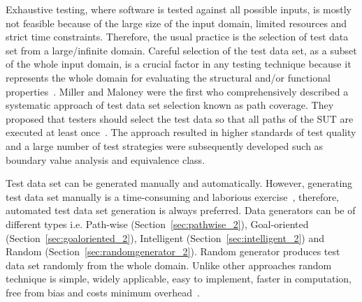 Exhaustive testing, where software is tested against all possible inputs, is mostly not feasible because of the large size of the input domain, limited resources and strict time constraints. Therefore, the usual practice is the selection of test data set from a large/infinite domain. Careful selection of the test data set, as a subset of the whole input domain, is a crucial factor in any testing technique because it represents the whole domain for evaluating the structural and/or functional properties~\cite{howden1986functional, mccabe1983structured}. Miller and Maloney were the first who comprehensively described a systematic approach of test data set selection known as path coverage. They proposed that testers should select the test data so that all paths of the SUT are executed at least once~\cite{miller1963systematic}. The approach resulted in higher standards of test quality and a large number of test strategies were subsequently developed such as boundary value analysis and equivalence class. 

Test data set can be generated manually and automatically. However, generating test data set manually is a time-consuming and laborious exercise~\cite{korel1990automated}, therefore, automated test data set generation is always preferred. Data generators can be of different types i.e. Path-wise (Section~\ref{sec:pathwise_2}), Goal-oriented (Section~\ref{sec:goaloriented_2}), Intelligent (Section~\ref{sec:intelligent_2}) and Random (Section~\ref{sec:randomgenerator_2}). Random generator produces test data set randomly from the whole domain. Unlike other approaches random technique is simple, widely applicable, easy to implement, faster in computation, free from bias and costs minimum overhead~\cite{ciupa2007experimental}. 

